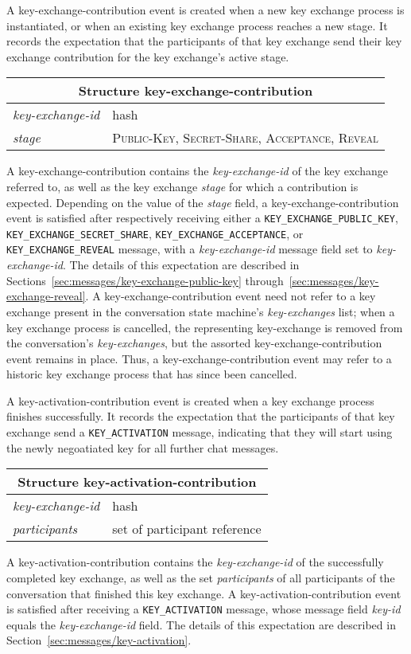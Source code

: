 \documentclass{article}
\def\message#1{\texttt{#1}}
\def\field#1{\textit{#1}}
\def\smfield#1{\textsl{#1}}
\def\type#1{\textsf{#1}}
\newenvironment{struct}[1]{
\newcommand{\structfield}[2]{
\smfield{##1} & \type{##2} \\
\hline
}
\par
\vspace{-\medskipamount}
\hspace{2em minus 2em}\begin{tabular}{|l|l|}
\hline
\multicolumn{2}{|c|}{Structure \type{#1}} \\
\hline
\hline
}{
\end{tabular}
\vspace{-\medskipamount}
\par
}
\begin{document}
A \type{key-exchange-contribution} event is created when a new key exchange process is instantiated, or when an existing key exchange process reaches a new stage.
It records the expectation that the participants of that key exchange send their key exchange contribution for the key exchange's active stage.
\begin{struct}{key-exchange-contribution}
\structfield{key-exchange-id}{hash}
\structfield{stage}{\normalfont \textsc{Public-Key}, \textsc{Secret-Share}, \textsc{Acceptance}, \textsc{Reveal}}
\end{struct}
A \type{key-exchange-contribution} contains the \smfield{key-exchange-id} of the key exchange referred to, as well as the key exchange \smfield{stage} for which a contribution is expected.
Depending on the value of the \smfield{stage} field, a \type{key-exchange-contribution} event is satisfied after respectively receiving either a \message{KEY\_EXCHANGE\_PUBLIC\_KEY}, \message{KEY\_EXCHANGE\_SECRET\_SHARE}, \message{KEY\_EXCHANGE\_ACCEPTANCE}, or \message{KEY\_EXCHANGE\_REVEAL} message, with a \field{key-exchange-id} message field set to \smfield{key-exchange-id}.
The details of this expectation are described in Sections~\ref{sec:messages/key-exchange-public-key} through~\ref{sec:messages/key-exchange-reveal}.
A \type{key-exchange-contribution} event need not refer to a key exchange present in the conversation state machine's \smfield{key-exchanges} list; when a key exchange process is cancelled, the representing \type{key-exchange} is removed from the conversation's \smfield{key-exchanges}, but the assorted \type{key-exchange-contribution} event remains in place.
Thus, a \type{key-exchange-contribution} event may refer to a historic key exchange process that has since been cancelled.

A \type{key-activation-contribution} event is created when a key exchange process finishes successfully.
It records the expectation that the participants of that key exchange send a \message{KEY\_ACTIVATION} message, indicating that they will start using the newly negoatiated key for all further chat messages.
\begin{struct}{key-activation-contribution}
\structfield{key-exchange-id}{hash}
\structfield{participants}{set of participant reference}
\end{struct}
A \type{key-activation-contribution} contains the \smfield{key-exchange-id} of the successfully completed key exchange, as well as the set \smfield{participants} of all participants of the conversation that finished this key exchange.
A \type{key-activation-contribution} event is satisfied after receiving a \message{KEY\_ACTIVATION} message, whose message field \field{key-id} equals the \smfield{key-exchange-id} field.
The details of this expectation are described in Section~\ref{sec:messages/key-activation}.
\end{document}
